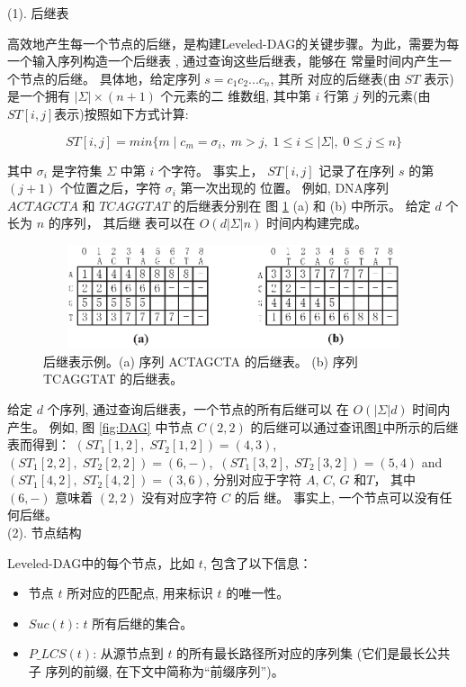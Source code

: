 (1). 后继表

高效地产生每一个节点的后继，是构建Leveled-DAG的关键步骤。为此，需要为每
一个输入序列构造一个后继表 \cite{Chen2006}, 通过查询这些后继表，能够在
常量时间内产生一个节点的后继。 具体地，给定序列 $s=c_1c_2...c_n$, 其所
对应的后继表(由 $ST$ 表示)是一个拥有 $|\Sigma| \times (n+1)$ 个元素的二
维数组, 其中第 $i$ 行第 $j$ 列的元素(由$ST[i, j]$表示)按照如下方式计算:

$$ST[i,j]=min\{m\;|\;c_m=\sigma_i,\; m > j,\; 1 \leq i \leq
|\Sigma|,\; 0 \leq j \leq n\}$$

其中 $\sigma_i$ 是字符集 $\Sigma$ 中第 $i$ 个字符。 事实上， $ST[i,j]$
记录了在序列 $s$ 的第 $(j+1)$ 个位置之后，字符 $\sigma_i$ 第一次出现的
位置。 例如, DNA序列 $ACTAGCTA$ 和 $TCAGGTAT$ 的后继表分别在
图 \ref{fig:ST} (a) 和 (b) 中所示。 给定 $d$ 个长为 $n$ 的序列， 其后继
表可以在 $O(d|\Sigma|n)$ 时间内构建完成。

\begin{figure}[!h]
  \centering
  \includegraphics[height=1.2in, width=4.8in]{figures/4_MLCS/successor_table}
  \caption{后继表示例。(a) 序列 ACTAGCTA 的后继表。 (b) 序列 TCAGGTAT
    的后继表。}
    \label{fig:ST}
  \end{figure}

  给定 $d$ 个序列, 通过查询后继表，一个节点的所有后继可以
  在 $O(|\Sigma|d)$ 时间内产生。 例如, 图 \ref{fig:DAG} 中节点 $C(2,
  2)$ 的后继可以通过查讯图\ref{fig:ST}中所示的后继表而得到：
  $(ST_1[1, 2],\;ST_2[1, 2]) = (4, 3)$,\,
  $(ST_1[2, 2],\;ST_2[2, 2]) = (6, -)$,\,
  $(ST_1[3, 2],\;ST_2[3, 2]) = (5, 4)$ and
  $(ST_1[4, 2],\;ST_2[4, 2]) = (3, 6)$, 分别对应于字符 $A$, $C$,
  $G$ 和$T$， 其中 $(6, -)$ 意味着 $(2, 2)$ 没有对应字符 $C$ 的后
  继。 事实上, 一个节点可以没有任何后继。\\

(2). 节点结构
\label{sec:Node}

Leveled-DAG中的每个节点，比如 $t$, 包含了以下信息：

\begin{itemize}
\item 节点 $t$ 所对应的匹配点, 用来标识 $t$ 的唯一性。
\item $Suc(t)$: $t$ 所有后继的集合。
\item $P\_LCS(t)$: 从源节点到 $t$ 的所有最长路径所对应的序列集 (它们是最长公共子
  序列的前缀, 在下文中简称为“前缀序列”)。
\end{itemize}

